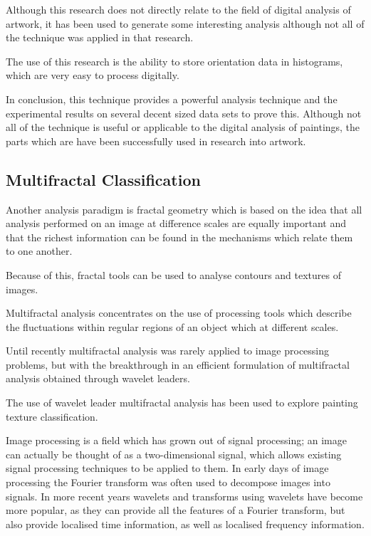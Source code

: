 \documentclass[conference]{IEEEtran}
\begin{document}
Although this research does not directly relate to the field of digital
analysis of artwork, it has been used to generate some interesting
analysis\cite{brown13can} although not all of the technique was applied in that
research.

The use of this research is the ability to store orientation data in
histograms, which are very easy to process digitally.

In conclusion, this technique provides a powerful analysis technique and the
experimental results on several decent sized data sets to prove this. Although
not all of the technique is useful or applicable to the digital analysis of
paintings, the parts which are have been successfully used in research into
artwork.

\subsection{Multifractal Classification}

Another analysis paradigm is fractal geometry which is based on the idea that
all analysis performed on an image at difference scales are equally important
and that the richest information can be found in the mechanisms which relate
them to one another.

Because of this, fractal tools can be used to analyse contours and textures of
images.

Multifractal analysis concentrates on the use of processing tools which
describe the fluctuations within regular regions of an object which at
different scales.

Until recently multifractal analysis was rarely applied to image processing
problems, but with the breakthrough in an efficient formulation of
multifractal analysis obtained through wavelet leaders.

The use of wavelet leader multifractal analysis has been used to explore
painting texture classification\cite{abry2013van}.

Image processing is a field which has grown out of signal processing; an image
can actually be thought of as a two-dimensional signal, which allows existing
signal processing techniques to be applied to them. In early days of image
processing the Fourier transform was often used to decompose images into
signals. In more recent years wavelets and transforms using wavelets have
become more popular, as they can provide all the features of a Fourier
transform, but also provide localised time information, as well as localised
frequency information.
\end{document}
